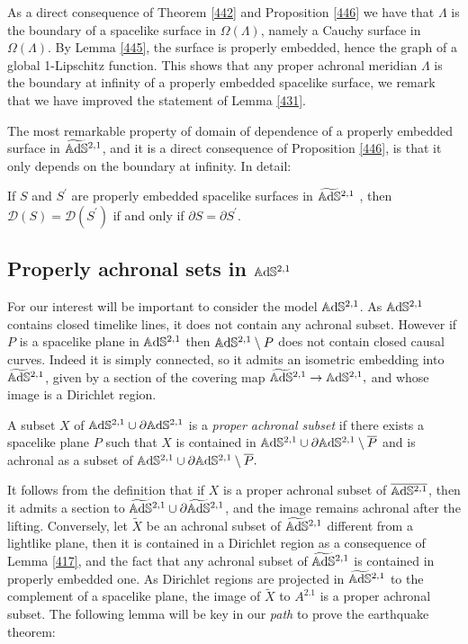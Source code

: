 \begin{observation}\label{447}
    As a direct consequence of Theorem \ref{442} and Proposition \ref{446} we have that $\Lambda$ is the boundary of a spacelike surface in $\Omega(\Lambda)$, namely a Cauchy surface in $\Omega(\Lambda)$. By Lemma \ref{445}, the surface is properly embedded, hence the graph of a global 1-Lipschitz function. This shows that any proper achronal meridian $\Lambda$ is the boundary at infinity of a properly embedded spacelike surface, we remark that we have improved the statement of Lemma \ref{431}.
\end{observation}

The most remarkable property of domain of dependence of a properly embedded surface in $\widetilde{\mathbb{A}\mathrm{d}\mathbb{S}}{}^{2,1}$, and it is a direct consequence of Proposition \ref{446}, is that it only depends on the boundary at infinity. In detail:

\begin{corollary}
    If $S$ and $S^{\prime}$ are properly embedded spacelike surfaces in $\widetilde{\mathbb{A}\mathrm{d}\mathbb{S}}{}^{2,1}$ , then $\mathcal{D}(S)=\mathcal{D}(S^{\prime})$ if and only if $\partial S=\partial S^{\prime}$.
\end{corollary}

\subsection{Properly achronal sets in $\mathbb{A}\mathrm{d}\mathbb{S}^{2,1}$}
For our interest will be important to consider the model $\mathbb{A}\mathrm{d}\mathbb{S}^{2,1}$. As $\mathbb{A}\mathrm{d}\mathbb{S}^{2,1}$ contains closed timelike lines, it does not contain any achronal subset. However if $P$ is a spacelike plane in $\mathbb{A}\mathrm{d}\mathbb{S}^{2,1}$ then $\mathbb{A}\mathrm{d}\mathbb{S}^{2,1}\setminus P$ does not contain closed causal curves. Indeed it is simply connected, so it admits an isometric embedding into $\widetilde{\mathbb{A}\mathrm{d}\mathbb{S}}{}^{2,1}$, given by a section of the covering map $\widetilde{\mathbb{A}\mathrm{d}\mathbb{S}}{}^{2,1}\to\mathbb{A}\mathrm{d}\mathbb{S}^{2,1},$ and whose image is a Dirichlet region.
\begin{definition}
    A subset $X$ of $\mathbb{A}\mathrm{d}\mathbb{S}^{2,1}\cup\partial\mathbb{A}\mathrm{d}\mathbb{S}^{2,1}$ is a \textit{proper achronal subset} if there exists a spacelike plane $P$ such that $X$ is contained in $\mathbb{A}\mathrm{d}\mathbb{S}^{2,1}\cup\partial\mathbb{A}\mathrm{d}\mathbb{S}^{2,1}\setminus\overline{P}$ and is achronal as a subset of $\mathbb{A}\mathrm{d}\mathbb{S}^{2,1}\cup\partial\mathbb{A}\mathrm{d}\mathbb{S}^{2,1}\setminus\overline{P}.$  
\end{definition}

It follows from the definition that if $X$ is a proper achronal subset of $\overline{\mathbb{A}\mathrm{d}\mathbb{S}^{2,1}}$, then it admits a section to $\widetilde{\mathbb{A}\mathrm{d}\mathbb{S}}{}^{2,1}\cup\partial\widetilde{\mathbb{A}\mathrm{d}\mathbb{S}}{}^{2,1}$, and the image remains achronal after the lifting. Conversely, let $\tilde{X}$ be an achronal subset of $\widetilde{\mathbb{A}\mathrm{d}\mathbb{S}}{}^{2,1}$ different from a lightlike plane, then it is contained in a Dirichlet region as a consequence of Lemma \ref{417}, and the fact that any achronal subset of $\widetilde{\mathbb{A}\mathrm{d}\mathbb{S}}{}^{2,1}$ is contained in properly embedded one. As Dirichlet regions are projected in $\widetilde{\mathbb{A}\mathrm{d}\mathbb{S}}{}^{2,1}$ to the complement of a spacelike plane, the image of $\tilde{X}$ to $A^{2.1}$ is a proper achronal subset. The following lemma will be key in our \textit{path} to prove the earthquake theorem:\\

